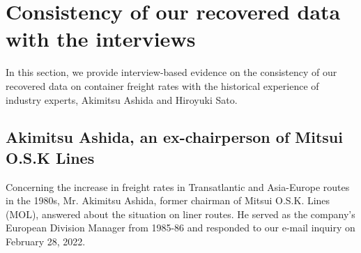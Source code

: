 \documentclass[11pt]{article}
\begin{document}




\section{Consistency of our recovered data with the interviews}\label{sec:interview}

In this section, we provide interview-based evidence on the consistency of our recovered data on container freight rates with the historical experience of industry experts, Akimitsu Ashida and Hiroyuki Sato.

\subsection{Akimitsu Ashida, an ex-chairperson of Mitsui O.S.K Lines}

Concerning the increase in freight rates in Transatlantic and Asia-Europe routes in the 1980s, Mr. Akimitsu Ashida, former chairman of Mitsui O.S.K. Lines (MOL), answered about the situation on liner routes. He served as the company's European Division Manager from 1985-86 and responded to our e-mail inquiry on February 28, 2022.\\
\end{document}
